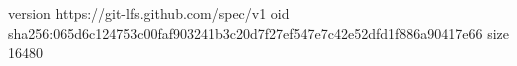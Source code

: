 version https://git-lfs.github.com/spec/v1
oid sha256:065d6c124753c00faf903241b3c20d7f27ef547e7c42e52dfd1f886a90417e66
size 16480

